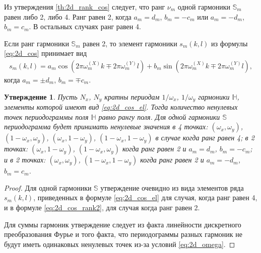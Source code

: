 \documentclass[specialist,
               substylefile = spbu.rtx,
               subf,href,colorlinks=true, 12pt]{disser}
\newtheorem{Th}{Утверждение}
\begin{document}
Из утверждения \ref{th:2d_rank_cos} следует, что ранг $\nu_m$ одной гармоники $\mathbb{S}_m$ равен либо 2, либо 4. Ранг равен 2, когда $a_m = d_m$, $b_m = -c_m$ или $a_m = -d_m$, $b_m = c_m$. В остальных случаях ранг равен 4.

Если ранг гармоники $\mathbb{S}_m$ равен 2, то элемент гармоники $s_m(k,l)$ из формулы \eqref{eq:2d_cos} принимает вид
\begin{gather} \label{eq:2d_cos_rank2}
s_m(k,l)=a_m \cos(2\pi \omega_m^{(X)}k \mp 2\pi \omega_m^{(Y)}l) + b_m \sin(2\pi \omega_m^{(X)}k \mp 2\pi \omega_m^{(Y)}l),
\end{gather}
когда $a_m = \pm d_m$, $b_m = \mp c_m$.

\begin{Th}
Пусть $N_x$, $N_y$ кратны периодам $1/\omega_x$, $1/\omega_y$ гармоники $\mathbb{H}$, элементы которой имеют вид \eqref{eq:2d_cos_el}.
Тогда количество ненулевых точек периодограммы поля $\mathbb{H}$ равно рангу поля. Для одной гармоники $\mathbb{S}$ периодограмма будет принимать ненулевые значения в 4 точках: $(\omega_x, \omega_y)$, $(1-\omega_x, \omega_y)$, $(\omega_x, 1-\omega_y)$, $(1-\omega_x, 1-\omega_y)$ в случае когда ранг равен 4; в 2 точках:  $(\omega_x, 1-\omega_y)$, $(1-\omega_x, \omega_y)$ когда ранг равен 2 и $a_m=d_m$, $b_m = -c_m$; и в 2 точках:  $(\omega_x, \omega_y)$, $(1-\omega_x, 1-\omega_y)$ когда ранг равен 2 и $a_m=-d_m$, $b_m = c_m$.
\end{Th}

\begin{proof}
Для одной гармоники $\mathbb{S}$ утверждение очевидно из вида элементов ряда $s_m(k,l)$, приведенных в формуле \eqref{eq:2d_cos_el} для случая, когда ранг равен 4, и в формуле \eqref{eq:2d_cos_rank2}, для случая когда ранг равен 2.

Для суммы гармоник утверждение следует из факта линейности дискретного преобразования Фурье и того факта, что периодограммы разных гармоник не будут иметь одинаковых ненулевых точек из-за условий \eqref{eq:2d_omega}.
\end{proof}
\end{document}
